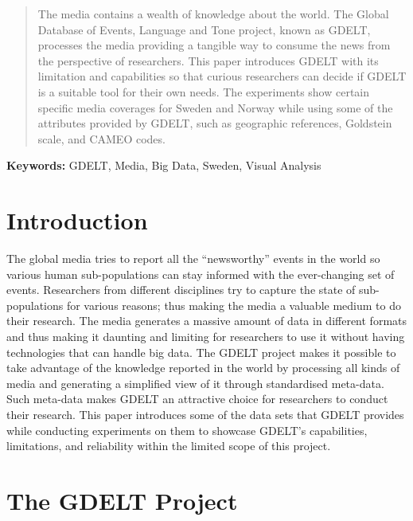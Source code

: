 \documentclass[a4, 11pt]{article}
\begin{document}
\newpage
\begin{abstract}
     The media contains a wealth of knowledge about the world. The Global
     Database of Events, Language and Tone project, known as GDELT, processes the
     media providing a tangible way to consume the news from the perspective of
     researchers. This paper introduces GDELT with its limitation and
     capabilities so that curious researchers can decide if GDELT is a suitable
     tool for their own needs. The experiments show certain specific media coverages for
     Sweden and Norway while using some of the attributes provided by GDELT,
     such as geographic references, Goldstein scale, and CAMEO codes.
    
\end{abstract}
\begin{center}
    \textbf{Keywords:} GDELT, Media, Big Data, Sweden, Visual Analysis
\end{center}
\setcounter{page}{2}
\newpage


\tableofcontents
\newpage

\section{Introduction}

 The global media tries to report all the ``newsworthy'' events in the world so various human sub-populations  
 can stay informed with the ever-changing set of events. Researchers from different disciplines
 try to capture the state of sub-populations for various reasons; thus making the media a
 valuable medium to do their research. The media generates a massive amount of
 data in different formats and thus making it daunting and limiting for researchers to
 use it without having technologies that can handle big data. The GDELT
 project \cite{GDELT}
 makes it possible to take advantage of the knowledge reported in the world
 by processing all kinds of media and generating a simplified view of it through standardised meta-data. Such meta-data makes 
 GDELT an attractive choice for researchers to conduct their research. This
 paper introduces some of the data sets that GDELT provides while conducting
 experiments on them to showcase GDELT's capabilities, limitations, and
 reliability within the limited scope of this project. 

 \section{The GDELT Project}
\end{document}
